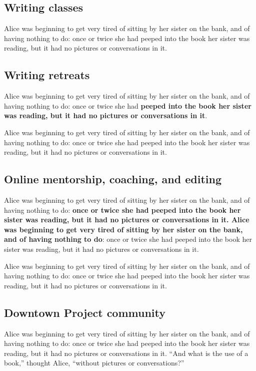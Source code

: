 \documentclass[12pt]{article}
\begin{document}
\subsection{Writing classes}
\label{sec-2-1}
Alice was beginning to get very tired of sitting by her sister on the bank, and of having nothing to do: once or twice she had peeped into the book her sister was reading, but it had no pictures or conversations in it. 

\subsection{Writing retreats}
\label{sec-2-2}
Alice was beginning to get very tired of sitting by her sister on the bank, and of having nothing to do: once or twice she had \textbf{peeped into the book her sister was reading, but it had no pictures or conversations in it}. 

Alice was beginning to get very tired of sitting by her sister on the bank, and of having nothing to do: once or twice she had peeped into the book her sister was reading, but it had no pictures or conversations in it. 

\subsection{Online mentorship, coaching, and editing}
\label{sec-2-3}
Alice was beginning to get very tired of sitting by her sister on the bank, and of having nothing to do: \textbf{once or twice she had peeped into the book her sister was reading, but it had no pictures or conversations in it. Alice was beginning to get very tired of sitting by her sister on the bank, and of having nothing to do}: once or twice she had peeped into the book her sister was reading, but it had no pictures or conversations in it. 

Alice was beginning to get very tired of sitting by her sister on the bank, and of having nothing to do: once or twice she had peeped into the book her sister was reading, but it had no pictures or conversations in it. 

\subsection{Downtown Project community}
\label{sec-2-4}
Alice was beginning to get very tired of sitting by her sister on the bank, and of having nothing to do: once or twice she had peeped into the book her sister was reading, but it had no pictures or conversations in it. ``And what is the use of a book,'' thought Alice, ``without pictures or conversations?'' 
\end{document}
